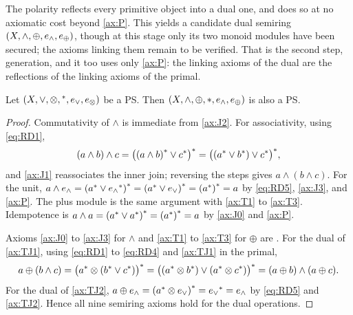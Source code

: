 


The polarity reflects every primitive object into a dual one, and
does so at no axiomatic cost beyond \eqref{ax:P}. This yields a candidate
dual semiring $(X,\wedge,\oplus,e_{\wedge},e_{\oplus})$, though at this stage only its two
monoid modules have been secured; the axioms linking them remain to be
verified. That is the second step, generation, and it too uses only
\eqref{ax:P}: the linking axioms of the dual are the reflections of the
linking axioms of the primal.

\begin{proposition}[Dual PS]\label{prop:dual-semiring}
Let $(X,\vee,\otimes,{}^{*},e_{\vee},e_{\otimes})$ be a PS.
Then $(X,\wedge,\oplus,*, e_{\wedge},e_{\oplus})$
is also a PS.
\end{proposition}

\begin{proof}
Commutativity of $\wedge$ is immediate from \eqref{ax:J2}. For associativity,
using \eqref{eq:RD1},
$$
  (a \wedge b) \wedge c
  = {\bigl({(a \wedge b)}^{*} \vee {c}^{*}\bigr)}^{*}
  = {\bigl(({a}^{*} \vee {b}^{*}) \vee {c}^{*}\bigr)}^{*},
$$
and \eqref{ax:J1} reassociates the inner join; reversing the steps gives
$a \wedge (b \wedge c)$. For the unit,
$a \wedge e_{\wedge}
 = {({a}^{*} \vee {e_{\wedge}}^{*})}^{*}
 = {({a}^{*} \vee e_{\vee})}^{*}
 = {({a}^{*})}^{*} = a$
by \eqref{eq:RD5}, \eqref{ax:J3}, and \eqref{ax:P}. The plus module is the
same argument with \eqref{ax:T1} to \eqref{ax:T3}. Idempotence is
$a \wedge a = {({a}^{*} \vee {a}^{*})}^{*} = {({a}^{*})}^{*} = a$
by \eqref{ax:J0} and \eqref{ax:P}.

Axioms \eqref{ax:J0} to \eqref{ax:J3} for $\wedge$ and \eqref{ax:T1} to
\eqref{ax:T3} for $\oplus$ are . For the dual of
\eqref{ax:TJ1}, using \eqref{eq:RD1} to \eqref{eq:RD4} and \eqref{ax:TJ1} in
the primal,
$$
  a \oplus (b \wedge c)
  = {\bigl({a}^{*} \otimes ({b}^{*} \vee {c}^{*})\bigr)}^{*}
  = {\bigl(({a}^{*} \otimes {b}^{*}) \vee
                 ({a}^{*} \otimes {c}^{*})\bigr)}^{*}
  = (a \oplus b) \wedge (a \oplus c).
$$
For the dual of \eqref{ax:TJ2},
$a \oplus e_{\wedge} = {({a}^{*} \otimes e_{\vee})}^{*} = {e_{\vee}}^{*} = e_{\wedge}$
by \eqref{eq:RD5} and \eqref{ax:TJ2}. Hence all nine semiring axioms hold for
the dual operations.
\end{proof}

